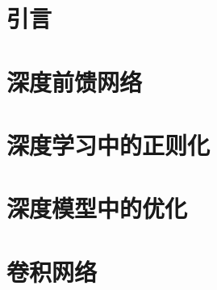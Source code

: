 \chapter{引言}

\chapter{深度前馈网络}





\chapter{深度学习中的正则化}













\chapter{深度模型中的优化}







\chapter{卷积网络}











